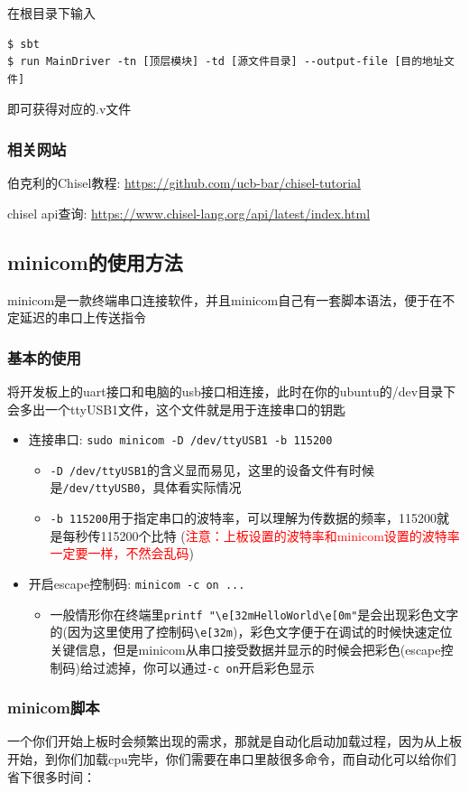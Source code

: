 \documentclass[lang=cn,11pt,a4paper]{elegantpaper}
\begin{document}
在根目录下输入
\begin{lstlisting}
$ sbt
$ run MainDriver -tn [顶层模块] -td [源文件目录] --output-file [目的地址文件]
\end{lstlisting}
即可获得对应的.v文件
\subsubsection{相关网站}
伯克利的Chisel教程: \url{https://github.com/ucb-bar/chisel-tutorial}

chisel api查询: \url{https://www.chisel-lang.org/api/latest/index.html}

\subsection{minicom的使用方法}

minicom是一款终端串口连接软件，并且minicom自己有一套脚本语法，便于在不定延迟的串口上传送指令

\subsubsection{基本的使用}
将开发板上的uart接口和电脑的usb接口相连接，此时在你的ubuntu的/dev目录下会多出一个ttyUSB1文件，这个文件就是用于连接串口的钥匙
\begin{itemize}
\item 连接串口: \lstinline!sudo minicom -D /dev/ttyUSB1 -b 115200!
\begin{itemize}
\item \lstinline!-D /dev/ttyUSB1!的含义显而易见，这里的设备文件有时候是\lstinline!/dev/ttyUSB0!，具体看实际情况
\item \lstinline!-b 115200!用于指定串口的波特率，可以理解为传数据的频率，115200就是每秒传115200个比特 (\textcolor{red}{注意：上板设置的波特率和minicom设置的波特率一定要一样，不然会乱码})
\end{itemize}
\item 开启escape控制码: \lstinline!minicom -c on ...!
\begin{itemize}
\item 一般情形你在终端里\lstinline!printf "\e[32mHelloWorld\e[0m"!是会出现彩色文字的(因为这里使用了控制码\lstinline!\e[32m!)，彩色文字便于在调试的时候快速定位关键信息，但是minicom从串口接受数据并显示的时候会把彩色(escape控制码)给过滤掉，你可以通过\lstinline!-c on!开启彩色显示
\end{itemize}
\end{itemize}

\subsubsection{minicom脚本}
一个你们开始上板时会频繁出现的需求，那就是自动化启动加载过程，因为从上板开始，到你们加载cpu完毕，你们需要在串口里敲很多命令，而自动化可以给你们省下很多时间：
\end{document}
